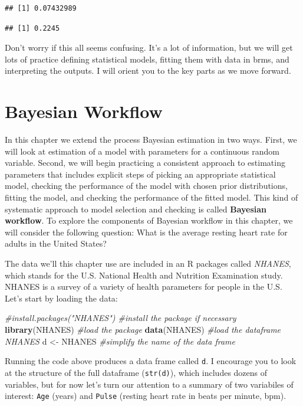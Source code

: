 \documentclass[
]{book}
\newenvironment{Shaded}{\begin{snugshade}}{\end{snugshade}}
\newcommand{\CommentTok}[1]{\textcolor[rgb]{0.56,0.35,0.01}{\textit{#1}}}
\newcommand{\FunctionTok}[1]{\textcolor[rgb]{0.13,0.29,0.53}{\textbf{#1}}}
\newcommand{\NormalTok}[1]{#1}
\newcommand{\OtherTok}[1]{\textcolor[rgb]{0.56,0.35,0.01}{#1}}
\begin{document}
\begin{verbatim}
## [1] 0.07432989
\end{verbatim}

\begin{verbatim}
## [1] 0.2245
\end{verbatim}

Don't worry if this all seems confusing. It's a lot of information, but
we will get lots of practice defining statistical models, fitting them
with data in brms, and interpreting the outputs. I will orient you to
the key parts as we move forward.

\chapter{Bayesian Workflow}\label{bayesian-workflow}

In this chapter we extend the process Bayesian estimation in two ways. First, we will look at estimation of a model with parameters for a continuous random variable. Second, we will begin practicing a consistent approach to estimating parameters that includes explicit steps of picking an appropriate statistical model, checking the performance of the model with chosen prior distributions, fitting the model, and checking the performance of the fitted model. This kind of systematic approach to model selection and checking is called \textbf{Bayesian workflow}. To explore the components of Bayesian workflow in this chapter, we will consider the following question: What is the average resting heart rate for adults in the United States?

The data we'll this chapter use are included in an R packages called \emph{NHANES}, which stands for the U.S. National Health and Nutrition Examination study. NHANES is a survey of a variety of health parameters for people in the U.S. Let's start by loading the data:

\begin{Shaded}
\begin{Highlighting}[]
\CommentTok{\#install.packages("NHANES") \#install the package if necessary}
\FunctionTok{library}\NormalTok{(NHANES) }\CommentTok{\#load the package}
\FunctionTok{data}\NormalTok{(NHANES) }\CommentTok{\#load the dataframe NHANES}
\NormalTok{d }\OtherTok{\textless{}{-}}\NormalTok{ NHANES }\CommentTok{\#simplify the name of the data frame}
\end{Highlighting}
\end{Shaded}

Running the code above produces a data frame called \texttt{d}. I encourage you to look at the structure of the full dataframe (\texttt{str(d)}), which includes dozens of variables, but for now let's turn our attention to a summary of two variabiles of interest: \texttt{Age} (years) and \texttt{Pulse} (resting heart rate in beats per minute, bpm).
\end{document}
